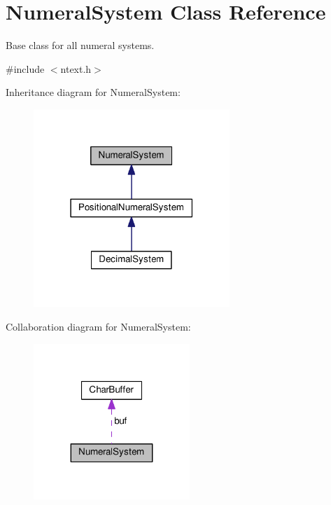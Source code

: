 \hypertarget{classNumeralSystem}{}\section{Numeral\+System Class Reference}
\label{classNumeralSystem}


Base class for all numeral systems.  




{\ttfamily \#include $<$ntext.\+h$>$}



Inheritance diagram for Numeral\+System\+:
\nopagebreak
\begin{figure}[H]
\begin{center}
\leavevmode
\includegraphics[width=210pt]{db/db7/classNumeralSystem__inherit__graph}
\end{center}
\end{figure}


Collaboration diagram for Numeral\+System\+:
\nopagebreak
\begin{figure}[H]
\begin{center}
\leavevmode
\includegraphics[width=167pt]{dd/d94/classNumeralSystem__coll__graph}
\end{center}
\end{figure}

